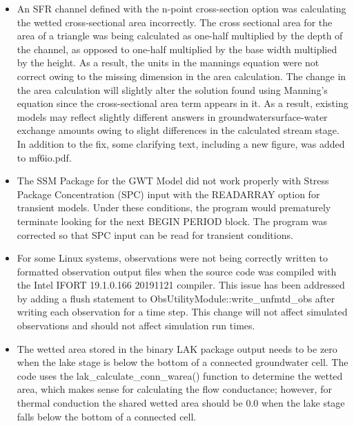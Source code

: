 \begin{itemize}
		\item An SFR channel defined with the n-point cross-section option was calculating the wetted cross-sectional area incorrectly. The cross sectional area for the area of a triangle was being calculated as one-half multiplied by the depth of the channel, as opposed to one-half multiplied by the base width multiplied by the height. As a result, the units in the mannings equation were not correct owing to the missing dimension in the area calculation.  The change in the area calculation will slightly alter the solution found using Manning's equation since the cross-sectional area term appears in it.  As a result, existing models may reflect slightly different answers in groundwater\/surface-water exchange amounts owing to slight differences in the calculated stream stage.  In addition to the fix, some clarifying text, including a new figure, was added to mf6io.pdf.
		\item The SSM Package for the GWT Model did not work properly with Stress Package Concentration (SPC) input with the READARRAY option for transient models.  Under these conditions, the program would prematurely terminate looking for the next BEGIN PERIOD block.  The program was corrected so that SPC input can be read for transient conditions.
		\item For some Linux systems, observations were not being correctly written to formatted observation output files when the source code was compiled with the Intel IFORT 19.1.0.166 20191121 compiler. This issue has been addressed by adding a flush statement to ObsUtilityModule::write\_unfmtd\_obs after writing each observation for a time step. This change will not affect simulated observations and should not affect simulation run times.
		\item The wetted area stored in the binary LAK package output needs to be zero when the lake stage is below the bottom of a connected groundwater cell.  The code uses the lak_calculate_conn_warea() function to determine the wetted area, which makes sense for calculating the flow conductance; however, for thermal conduction the shared wetted area should be 0.0 when the lake stage falls below the bottom of a connected cell.
	\end{itemize}

